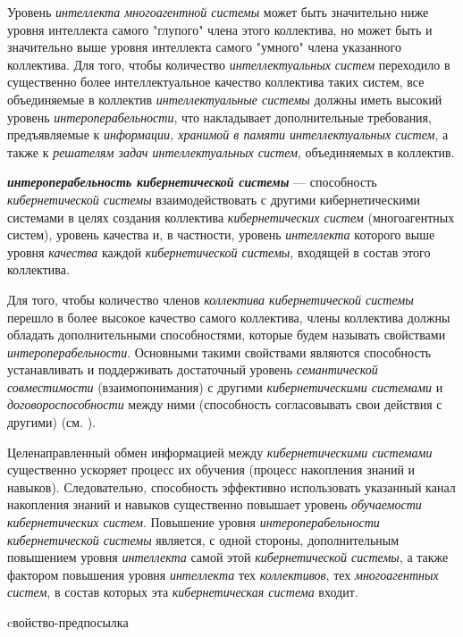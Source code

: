 Уровень \textit{интеллекта многоагентной системы} может быть значительно ниже уровня интеллекта самого "глупого"{} члена этого коллектива, но может быть и значительно выше уровня интеллекта самого "умного"{} члена указанного коллектива.
Для того, чтобы количество \textit{интеллектуальных систем} переходило в существенно более интеллектуальное качество коллектива таких систем, все объединяемые в коллектив \textit{интеллектуальные системы} должны иметь высокий уровень \textit{интероперабельности}, что накладывает дополнительные требования, предъявляемые к \textit{информации, хранимой в памяти интеллектуальных систем}, а также к \textit{решателям задач интеллектуальных систем}, объединяемых в коллектив.

\textbf{\textit{интероперабельность кибернетической системы}} --- способность \textit{кибернетической системы} взаимодействовать с другими кибернетическими системами в целях создания коллектива \textit{кибернетических систем} (многоагентных систем), уровень качества и, в частности, уровень \textit{интеллекта} которого выше уровня \textit{качества} каждой \textit{кибернетической системы}, входящей в состав этого коллектива.

Для того, чтобы количество членов \textit{коллектива кибернетической системы} перешло в более высокое качество самого коллектива, члены коллектива должны обладать дополнительными способностями, которые будем называть свойствами \textit{интероперабельности}.
Основными такими свойствами являются способность устанавливать и поддерживать достаточный уровень \textit{семантической совместимости} (взаимопонимания) с другими \textit{кибернетическими системами} и \textit{договороспособности} между ними (способность согласовывать свои действия с другими) (см. ).

Целенаправленный обмен информацией между \textit{кибернетическими системами} существенно ускоряет процесс их обучения (процесс накопления знаний и навыков). Следовательно, способность эффективно использовать указанный канал накопления знаний и навыков существенно повышает уровень \textit{обучаемости кибернетических систем}. Повышение уровня \textit{интероперабельности кибернетической системы} является, с одной стороны, дополнительным повышением уровня \textit{интеллекта} самой этой \textit{кибернетической системы}, а также фактором повышения уровня \textit{интеллекта} тех \textit{коллективов}, тех \textit{многоагентных систем}, в состав которых эта \textit{кибернетическая система} входит.

\begin{SCn}
\begin{scnrelfromlist}{cвойство-предпосылка}
\end{scnrelfromlist}
\end{SCn}

